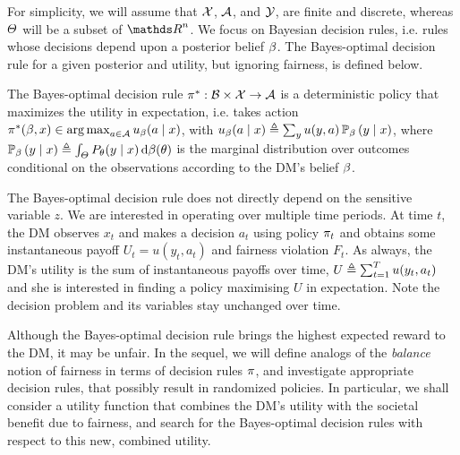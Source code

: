 For simplicity, we will
assume that $\mathcal{X}$, $ \mathcal{A}$, and $\mathcal{Y}$, are finite and discrete,
whereas $\Theta$ will be a subset of $\Reals^n$. We focus on Bayesian
decision rules, i.e. rules whose decisions  depend upon a
posterior belief $\beta$. The Bayes-optimal
decision rule for a given posterior and utility, but ignoring
fairness, is defined below. 
%
\begin{definition}
  The Bayes-optimal decision rule $\pi^* : \mathcal{B} \times \mathcal{X} \to \mathcal{A}$ is a
  deterministic policy that maximizes the utility in expectation,
  i.e. takes action
  $\pi^*(\beta, x) \in \mathop{\rm arg\,max}_{a \in \mathcal{A}} u_{\beta}(a \mid x)$, with
  $u_{\beta}(a \mid x) \mathrel{\triangleq} \sum_y u(y, a)  \mathop{\mbox{\ensuremath{\mathbb{P}}}}\nolimits_{\beta}{(y \mid x)}$,
  where  $\mathop{\mbox{\ensuremath{\mathbb{P}}}}\nolimits_{\beta}{(y \mid x)} \mathrel{\triangleq} \int_\Theta P_\theta(y \mid x) \,\mathrm{d} \beta (\theta)$
  is the marginal distribution over outcomes conditional on the observations according to the DM's belief $\beta$.
  \label{def:Bayes-rule}
\end{definition}

The Bayes-optimal decision rule does not directly depend on the
sensitive variable $z$.  We are interested in operating over multiple
time periods. At time $t$, the DM observes $x_t$ and makes a
decision $a_t$ using policy $\pi_t$ and obtains some instantaneous
payoff $U_t = u(y_t, a_t)$ and fairness violation $F_t$.  As always,
the DM's utility is the sum of instantaneous payoffs over time, $U
\mathrel{\triangleq} \sum_{t=1}^T u(y_t, a_t)$ and she is interested in finding a policy
maximising $U$ in expectation. Note the decision problem and its variables stay unchanged over time. %

Although the Bayes-optimal decision rule brings the highest expected reward to 
the DM, it may be unfair.  
In the sequel, we will define analogs of the \emph{balance} notion of fairness in
terms of decision rules $\pi$, and investigate appropriate decision rules, that 
possibly result in randomized policies.  In particular, we shall consider a utility function that combines the DM's utility with the societal benefit due to fairness, and search for the Bayes-optimal decision rules with respect to this new,
combined utility.

